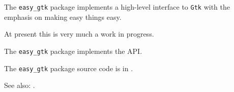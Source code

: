
The {\tt easy\_gtk} package implements a high-level interface to 
{\tt Gtk} with the emphasis on making easy things easy.

At present this is very much a work in progress.

The {\tt easy\_gtk} package implements the  API.

The {\tt easy\_gtk} package source code is in .

See also:  .

